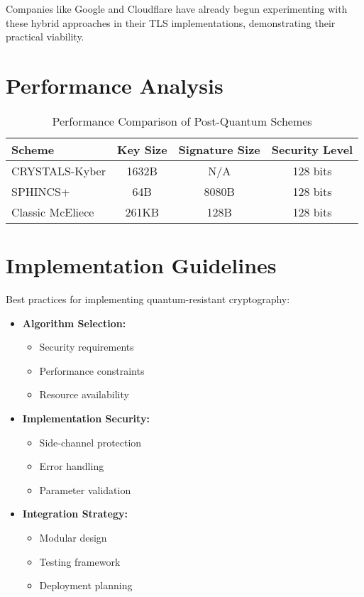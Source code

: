 Companies like Google and Cloudflare have already begun experimenting with these hybrid approaches in their TLS implementations, demonstrating their practical viability.

\section{Performance Analysis}\label{sec:performance}

\begin{table}[h]
    \centering
    \caption{Performance Comparison of Post-Quantum Schemes}
    \label{tab:pq_performance}
    \begin{tabular}{|l|c|c|c|}
        \hline
        \textbf{Scheme} & \textbf{Key Size} & \textbf{Signature Size} & \textbf{Security Level} \\
        \hline
        CRYSTALS-Kyber & 1632B & N/A & 128 bits \\
        SPHINCS+ & 64B & 8080B & 128 bits \\
        Classic McEliece & 261KB & 128B & 128 bits \\
        \hline
    \end{tabular}
\end{table}

\section{Implementation Guidelines}\label{sec:pqc_implementation}

Best practices for implementing quantum-resistant cryptography:

\begin{itemize}
    \item \textbf{Algorithm Selection:}
    \begin{itemize}
        \item Security requirements
        \item Performance constraints
        \item Resource availability
    \end{itemize}
    \item \textbf{Implementation Security:}
    \begin{itemize}
        \item Side-channel protection
        \item Error handling
        \item Parameter validation
    \end{itemize}
    \item \textbf{Integration Strategy:}
    \begin{itemize}
        \item Modular design
        \item Testing framework
        \item Deployment planning
    \end{itemize}
\end{itemize}

